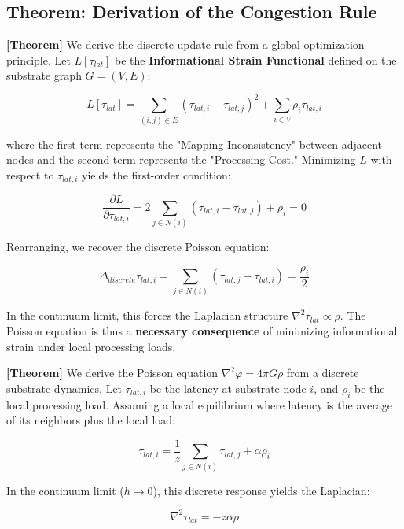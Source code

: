 \documentclass[11pt,titlepage]{article}
\newcommand{\tagtheo}{\textcolor{green!60!black}{\textbf{[Theorem]}} }
\begin{document}
\subsection{Theorem: Derivation of the Congestion Rule}
\tagtheo We derive the discrete update rule from a global optimization principle. Let $L[\tau_{lat}]$ be the \textbf{Informational Strain Functional} defined on the substrate graph $G=(V,E)$:

\begin{equation}
L[\tau_{lat}] = \sum_{(i,j) \in E} (\tau_{lat, i} - \tau_{lat, j})^2 + \sum_{i \in V} \rho_i \tau_{lat, i}
\end{equation}

where the first term represents the "Mapping Inconsistency" between adjacent nodes and the second term represents the "Processing Cost." Minimizing $L$ with respect to $\tau_{lat, i}$ yields the first-order condition:

\begin{equation}
\frac{\partial L}{\partial \tau_{lat, i}} = 2 \sum_{j \in N(i)} (\tau_{lat, i} - \tau_{lat, j}) + \rho_i = 0
\end{equation}

Rearranging, we recover the discrete Poisson equation:

\begin{equation}
\Delta_{discrete} \tau_{lat, i} = \sum_{j \in N(i)} (\tau_{lat, j} - \tau_{lat, i}) = \frac{\rho_i}{2}
\end{equation}

In the continuum limit, this forces the Laplacian structure $\nabla^2 \tau_{lat} \propto \rho$. The Poisson equation is thus a \textbf{necessary consequence} of minimizing informational strain under local processing loads.

\tagtheo We derive the Poisson equation $\nabla^2 \varphi = 4\pi G \rho$ from a discrete substrate dynamics. Let $\tau_{lat, i}$ be the latency at substrate node $i$, and $\rho_i$ be the local processing load. Assuming a local equilibrium where latency is the average of its neighbors plus the local load:

\begin{equation}
\tau_{lat, i} = \frac{1}{z} \sum_{j \in N(i)} \tau_{lat, j} + \alpha \rho_i
\end{equation}

In the continuum limit ($h \to 0$), this discrete response yields the Laplacian:

\begin{equation}
\nabla^2 \tau_{lat} = -z \alpha \rho
\end{equation}
\end{document}
